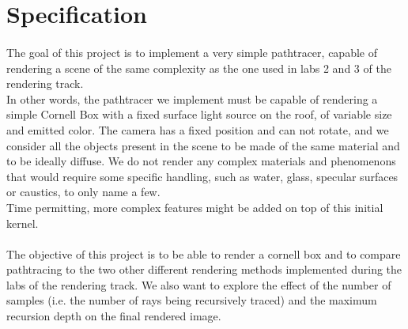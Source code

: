 \documentclass[12pt, oneside]{report}
\begin{document}
\section*{Specification}

\paragraph{}The goal of this project is to implement a very simple pathtracer, capable of rendering a scene of the same complexity as the one used in labs 2 and 3 of the rendering track. \\
In other words, the pathtracer we implement must be capable of rendering a simple Cornell Box with a fixed surface light source on the roof, of variable size and emitted color. The camera has a fixed position and can not rotate, and we consider all the objects present in the scene to be made of the same material and to be ideally diffuse. We do not render any complex materials and phenomenons that would require some specific handling, such as water, glass, specular surfaces or caustics, to only name a few. \\ Time permitting, more complex features might be added on top of this initial kernel.

\paragraph{}The objective of this project is to be able to render a cornell box and to compare pathtracing to the two other different rendering methods implemented during the labs of the rendering track. We also want to explore the effect of the number of samples (i.e. the number of rays being recursively traced) and the maximum recursion depth on the final rendered image.

\nocite{*}


\end{document}
